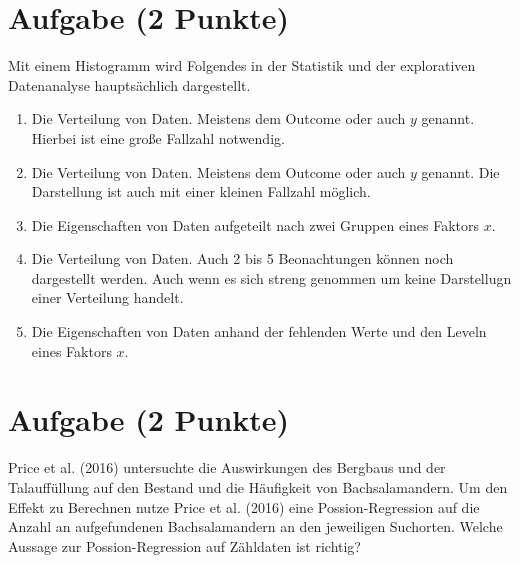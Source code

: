 \documentclass[a4paper, 10pt]{scrartcl}\usepackage[]{graphicx}\usepackage[]{color}
\begin{document}
\section{Aufgabe \hfill (2 Punkte)}



Mit einem Histogramm wird Folgendes in der Statistik und der explorativen Datenanalyse hauptsächlich dargestellt.



\begin{enumerate}
\item [\textbf{A} \msquare] Die Verteilung von Daten. Meistens dem Outcome oder auch $y$ genannt. Hierbei ist eine große Fallzahl notwendig.
\item [\textbf{B} \msquare] Die Verteilung von Daten. Meistens dem Outcome oder auch $y$ genannt. Die Darstellung ist auch mit einer kleinen Fallzahl möglich.
\item [\textbf{C} \msquare] Die Eigenschaften von Daten aufgeteilt nach zwei Gruppen eines Faktors $x$.
\item [\textbf{D} \msquare] Die Verteilung von Daten. Auch 2 bis 5 Beonachtungen können noch dargestellt werden. Auch wenn es sich streng genommen um keine Darstellugn einer Verteilung handelt.
\item [\textbf{E} \msquare] Die Eigenschaften von Daten anhand der fehlenden Werte und den Leveln eines Faktors $x$.
\end{enumerate}

\section{Aufgabe \hfill (2 Punkte)}

Price et al. (2016) untersuchte die Auswirkungen des Bergbaus und der
Talauff{\"u}llung auf den Bestand und die H{\"a}ufigkeit von Bachsalamandern. Um
den Effekt zu Berechnen nutze Price et al. (2016) eine Possion-Regression
auf die Anzahl an aufgefundenen Bachsalamandern an den jeweiligen
Suchorten. Welche Aussage zur Possion-Regression auf Z{\"a}hldaten ist richtig?
\end{document}
